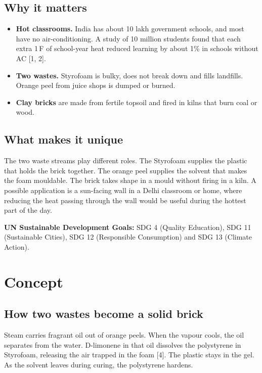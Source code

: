\documentclass[11pt,a4paper]{article}
\begin{document}
\subsection{Why it matters}
\begin{itemize}[leftmargin=*,itemsep=2pt]
  \item \textbf{Hot classrooms.} India has about 10 lakh government schools,
        and most have no air-conditioning. A study of 10 million students
        found that each extra 1\,\textdegree F of school-year heat reduced learning by
        about 1\% in schools without AC [1, 2].
  \item \textbf{Two wastes.} Styrofoam is bulky, does not break down and fills
        landfills. Orange peel from juice shops is dumped or burned.
  \item \textbf{Clay bricks} are made from fertile topsoil and fired in kilns
        that burn coal or wood.
\end{itemize}

\subsection{What makes it unique}
The two waste streams play different roles. The Styrofoam supplies the
plastic that holds the brick together. The orange peel supplies the solvent
that makes the foam mouldable. The brick takes shape in a mould without firing
in a kiln. A possible application is a sun-facing wall in a Delhi classroom or
home, where reducing the heat passing through the wall would be useful during
the hottest part of the day.

\textbf{UN Sustainable Development Goals:} SDG 4 (Quality Education), SDG 11
(Sustainable Cities), SDG 12 (Responsible Consumption) and SDG 13 (Climate Action).

\section{Concept}
\subsection{How two wastes become a solid brick}
Steam carries fragrant oil out of orange peels. When the vapour cools, the oil
separates from the water. D-limonene in that oil dissolves the polystyrene in
Styrofoam, releasing the air trapped in the foam [4]. The plastic stays in the
gel. As the solvent leaves during curing, the polystyrene hardens.
\end{document}
